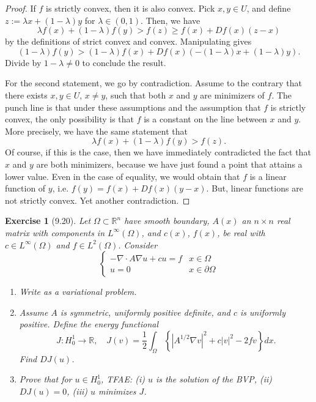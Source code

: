 \documentclass[letterpaper,twoside,11pt]{article}
\theoremstyle{mystyle}
\newtheorem*{exercise}{Exercise}
\newcommand{\R}{{\mathbb R}}
\newcommand{\cbk}{\color{black}}
\newcommand{\cblu}{\color{blue}}
\newcommand{\Ltwo}{L^2 \left( \Omega \right)}
\begin{document}
\cblu 
\begin{proof}
  If $f$ is strictly convex, then it is also convex. Pick $x, y \in U$, and define $z := \lambda x + \left( 1-\lambda \right)y$ for $\lambda \in (0,1)$. Then, we have 
  \[\lambda f(x) + \left( 1-\lambda  \right)f(y)>f(z) \geq f(x) + Df(x) (z-x)\]
  by the definitions of strict convex and convex. Manipulating gives 
  \[\left( 1-\lambda \right)f(y) > (1-\lambda) f(x) + Df(x) (-(1-\lambda)x + (1-\lambda )y). \]
  Divide by $1-\lambda \neq 0$ to conclude the result. 

  For the second statement, we go by contradiction. Assume to the contrary that there exists $x,y \in U$, $x \neq y$, such that both $x$ and $y$ are minimizers of $f$. The punch line is that under these assumptions and the assumption that $f$ is strictly convex, the only possibility is that $f$ is a constant on the line between $x$ and $y$. More precisely, we have the same statement that 
  \[\lambda f(x) + \left( 1-\lambda  \right)f(y)>f(z).\]
  Of course, if this is the case, then we have immediately contradicted the fact that $x$ and $y$ are both minimizers, because we have just found a point that attains a lower value. Even in the case of equality, we would obtain that $f$ is a linear function of $y$, i.e. $f(y) = f(x) + Df(x)(y-x)$. But, linear functions are not strictly convex. Yet another contradiction.
\end{proof}
\cbk 

\begin{exercise}[9.20]
  Let $\Omega\subset \R^n$ have smooth boundary, $A(x)$ an $n \times n$ real matrix with components in $L^\infty (\Omega)$, and $c(x)$, $f(x)$, be real with $c \in L^\infty (\Omega)$ and $f \in \Ltwo$. Consider 
  \[\left\{ {\begin{array}{*{20}{rl}}
    -\nabla \cdot A \nabla u + cu = f & x\in \Omega \\[.2cm] 
    u = 0 & x \in \partial \Omega 
  \end{array}} \right.\] 
  \begin{enumerate}
    \item Write as a variational problem. 
    \item Assume $A$ is symmetric, uniformly positive definite, and $c$ is uniformly positive. Define the energy functional 
    \[J : H_0^1 \to \R, \quad J(v) = \frac{1}{2}\int_\Omega \left\{ |A^{1/2} \nabla v|^2 + c|v|^2 - 2fv \right\}dx.\]
    Find $DJ(u)$. 
    \item Prove that for $u \in H_0^1$, TFAE: (i) $u$ is the solution of the BVP, (ii) $DJ(u) = 0$, (iii) $u$ minimizes $J$. 
  \end{enumerate}
\end{exercise}
\end{document}
